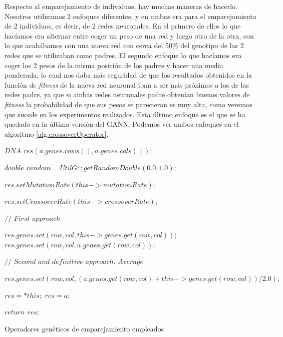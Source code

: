 Respecto al emparejamiento de individuos, hay muchas maneras de hacerlo. Nosotros utilizamos 2 enfoques diferentes, y en ambos era para el emparejamiento de 2 individuos, es decir, de 2 redes neuronales. En el primero de ellos lo que hacíamos era alternar entre coger un peso de una red y luego otro de la otra, con lo que acabábamos con una nueva red con cerca del 50\% del genotipo de las 2 redes que se utilizaban como padres. El segundo enfoque lo que hacíamos era coger los 2 pesos de la misma posición de los padres y hacer una media ponderada, lo cual nos daba más seguridad de que los resultados obtenidos en la función de \textit{fitness} de la nueva red neuronal iban a ser más próximos a los de las redes padre, ya que si ambas redes neuronales padre obtenían buenos valores de \textit{fitness} la probabilidad de que sus pesos se parecieran es muy alta, como veremos que sucede en los experimentos realizados. Esta último enfoque es el que se ha quedado en la última versión del GANN. Podemos ver ambos enfoques en el algoritmo \ref{alg:crossoverOperator}.

\begin{algorithm}[H]
    $DNA$ $res(a.genes.rows(), a.genes.cols());$

    $double$ $random = UtilG::getRandomDouble(0.0, 1.0);$

    {
        $res.setMutationRate(this->mutationRate);$
        
        $res.setCrossoverRate(this->crossoverRate);$

        {
            {
                {
                    $//$ $First$ $approach$
                    
                    {
                        $res.genes.set(row, col, this->genes.get(row, col));$
                    }
                    {
                        $res.genes.set(row, col, a.genes.get(row, col));$
                    }

                    $//$ $Second$ $and$ $definitive$ $approach.$ $Average$
                    
                    $res.genes.set(row, col, (a.genes.get(row, col) + this->genes.get(row, col)) / 2.0);$
                }
            }
        }
    }
    {
        {
            $res = *this;$
        }
        {
            $res = a;$
        }
    }

    $return$ $res;$
    
	\caption{Operadores genéticos de emparejamiento empleados}
	\label{alg:crossoverOperator}
\end{algorithm}

